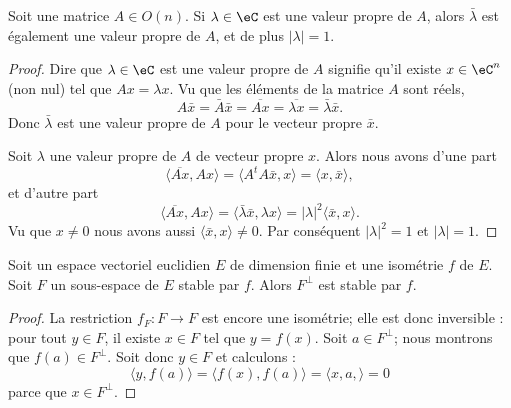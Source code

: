 \begin{proposition}      \label{PROPooVEJGooWnqtMm}
    Soit une matrice \( A\in O(n)\). Si \( \lambda\in \eC\) est une valeur propre de \( A\), alors \( \bar\lambda\) est également une valeur propre de \( A\), et de plus \( | \lambda |=1\).
\end{proposition}

\begin{proof}
    Dire que \( \lambda\in \eC\) est une valeur propre de \( A\) signifie qu'il existe \( x\in \eC^n\) (non nul) tel que \( Ax=\lambda x\). Vu que les éléments de la matrice \( A\) sont réels,
    \begin{equation}
        A\bar x=\bar A\bar x=\overline{ Ax }=\overline{ \lambda x }=\bar \lambda\bar x.
    \end{equation}
    Donc \( \bar \lambda\) est une valeur propre de \( A\) pour le vecteur propre \( \bar x\).

    Soit \( \lambda\)  une valeur propre de \( A\) de vecteur propre \( x\). Alors nous avons d'une part
    \begin{equation}
        \langle \overline{ Ax }, Ax\rangle =\langle A^tA\bar x, x\rangle =\langle x, \bar x\rangle ,
    \end{equation}
    et d'autre part
    \begin{equation}
        \langle \overline{ Ax }, Ax\rangle =\langle \bar \lambda \bar x, \lambda x\rangle =| \lambda |^2\langle \bar x, x\rangle .
    \end{equation}
    Vu que \( x\neq 0\) nous avons aussi \( \langle \bar x, x\rangle \neq 0\). Par conséquent \( | \lambda |^2=1\) et \( | \lambda |=1\).
\end{proof}

\begin{lemma}        \label{LEMooNEDQooNRmASH}
    Soit un espace vectoriel euclidien \( E\) de dimension finie et une isométrie \( f\) de \( E\). Soit \( F\) un sous-espace de \( E\) stable par \( f\). Alors \( F^{\perp}\) est stable par \( f\).
\end{lemma}

\begin{proof}
    La restriction \( f_F\colon F\to F\) est encore une isométrie; elle est donc inversible : pour tout $y\in F$, il existe \( x\in F\) tel que \( y=f(x)\). Soit \( a\in F^{\perp}\); nous montrons que \( f(a)\in F^{\perp}\). Soit donc \( y\in F\) et calculons :
    \begin{equation}
        \langle y, f(a)\rangle =\langle f(x), f(a)\rangle =\langle x,a, \rangle =0
    \end{equation}
    parce que \( x\in F^{\perp}\).
\end{proof}

